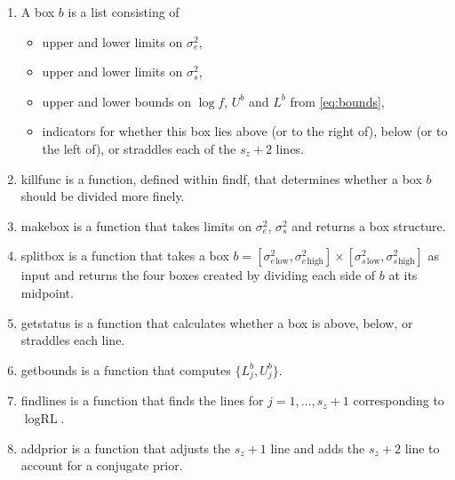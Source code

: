 \documentclass[ejs]{imsart}
\newcommand{\textcompute}{\textsf}
\newcommand{\RL}{f}
\newcommand{\RLorig}{\text{RL}}
\newcommand{\logRL}{\log\RL}
\newcommand{\logRLorig}{\log\RLorig}
\newcommand{\sigssq}{\sigma_s^2}
\newcommand{\sigesq}{\sigma_e^2}
\begin{document}
\begin{enumerate}
\item A \textcompute{box} $b$ is a list consisting of
	 \begin{itemize}
	 \item upper and lower limits on $\sigesq$,
	 \item upper and lower limits on $\sigssq$,
	 \item upper and lower bounds on $\logRL$, $U^b$ and $L^b$ from \eqref{eq:bounds},
	 \item indicators for whether this box lies above (or to the right of), below (or to the left of),
	   or straddles each of the $s_z+2$ lines.
	 \end{itemize}
\item \textcompute{killfunc} is a function, defined within \textcompute{findf}, that determines whether
	a box $b$ should be divided more finely.
\item \textcompute{makebox} is a function that takes limits on $\sigesq$, $\sigssq$ and returns a
	\textcompute{box} structure. 
\item \textcompute{splitbox} is a function that takes a box $b =
	[\sigesq{}_\text{low}, \sigesq{}_\text{high}] \times [\sigssq{}_\text{low}, \sigssq{}_\text{high}]$ as input 
	and returns the four boxes created by dividing each side of $b$ at its midpoint.
\item \textcompute{getstatus} is a function that calculates whether a box is above, below, or straddles
	each line.
\item \textcompute{getbounds} is a function that computes $\{L^b_j, U^b_j\}$.
\item \textcompute{findlines} is a function that finds the lines for $j=1,\dots,s_z+1$ corresponding to $\logRLorig$.
\item \textcompute{addprior} is a function that adjusts the $s_z+1$ line and adds the $s_z+2$ line
	to account for a conjugate prior.
\end{enumerate}
\end{document}
